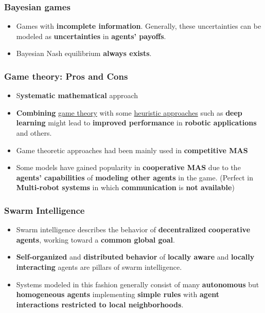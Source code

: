 \documentclass{beamer}
\begin{document}
	\begin{frame}
		\frametitle{Bayesian games}
		\begin{itemize}
			\item Games with \textbf{incomplete information}. Generally, these uncertainties can be modeled as \textbf{uncertainties} in \textbf{agents’ payoffs}.
			
			\item Bayesian Nash equilibrium \textbf{always exists}.
		\end{itemize}
	\end{frame}

	\begin{frame}
		\frametitle{Game theory: Pros and Cons}
		\begin{itemize}
			\item S\textbf{ystematic mathematical }approach
			
			\item \textbf{Combining} \underline{game theory} with some \underline{heuristic approaches} such as \textbf{deep learning} might lead to \textbf{improved performance} in \textbf{robotic applications} and others.
			
			\item Game theoretic approaches had been mainly used in \textbf{competitive MAS}
			
			\item Some models have gained popularity in \textbf{cooperative MAS} due to the \textbf{agents’ capabilities} of \textbf{modeling other agents} in the game. (Perfect in \textbf{Multi-robot systems} in which \textbf{communication} is \textbf{not available})
			
		\end{itemize}
	\end{frame}

	\begin{frame}
		\frametitle{Swarm Intelligence}
		\begin{itemize}
			\item Swarm intelligence describes the behavior of \textbf{decentralized} \textbf{cooperative} \textbf{agents}, working toward a \textbf{common global goal}.
			
			\item \textbf{Self-organized} and \textbf{distributed} \textbf{behavior} of \textbf{locally aware} and \textbf{locally interacting} agents are pillars of swarm intelligence.
			
			\item Systems modeled in this fashion generally consist of many \textbf{autonomous} but \textbf{homogeneous agents} implementing \textbf{simple rules} with \textbf{agent interactions restricted to local neighborhoods}.
		\end{itemize}
	\end{frame}
\end{document}
